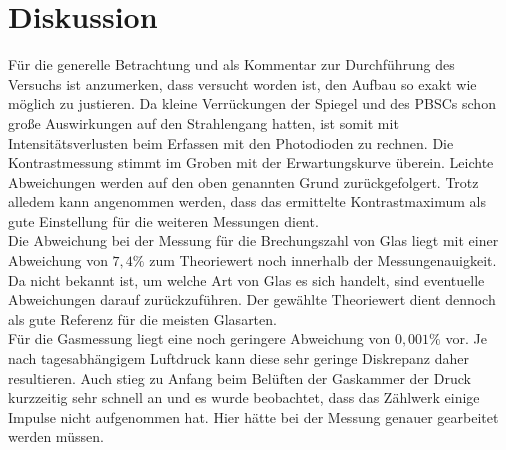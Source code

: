 \section{Diskussion}
Für die generelle Betrachtung und als Kommentar zur Durchführung des Versuchs ist anzumerken, dass
versucht worden ist, den Aufbau so exakt wie möglich zu justieren.
Da kleine Verrückungen der Spiegel und des PBSCs schon große Auswirkungen auf den Strahlengang hatten, ist somit mit
Intensitätsverlusten beim Erfassen mit den Photodioden zu rechnen.
Die Kontrastmessung stimmt im Groben mit der Erwartungskurve überein.
Leichte Abweichungen werden auf den oben genannten Grund zurückgefolgert.
Trotz alledem kann angenommen werden, dass das ermittelte Kontrastmaximum als gute Einstellung für die weiteren Messungen dient.\\
Die Abweichung bei der Messung für die Brechungszahl von Glas liegt mit einer Abweichung von $7,4 \%$ zum Theoriewert noch innerhalb der Messungenauigkeit.
Da nicht bekannt ist, um welche Art von Glas es sich handelt, sind eventuelle Abweichungen darauf zurückzuführen.
Der gewählte Theoriewert dient dennoch als gute Referenz für die meisten Glasarten.\\
Für die Gasmessung liegt eine noch geringere Abweichung von $0,001\%$ vor.
Je nach tagesabhängigem Luftdruck kann diese sehr geringe Diskrepanz daher resultieren.
Auch stieg zu Anfang beim Belüften der Gaskammer der Druck kurzzeitig sehr schnell an und es wurde beobachtet, dass das Zählwerk einige Impulse nicht aufgenommen hat.
Hier hätte bei der Messung genauer gearbeitet werden müssen.
